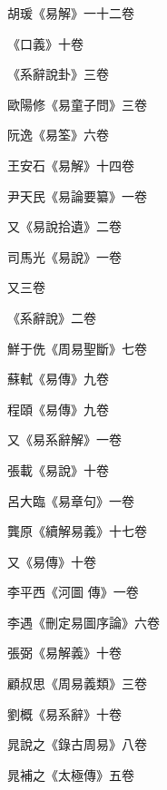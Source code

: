 \begin{pinyinscope}
 胡瑗《易解》一十二卷



 《口義》十卷



 《系辭說卦》三卷



 歐陽修《易童子問》三卷



 阮逸《易筌》六卷



 王安石《易解》十四卷



 尹天民《易論要纂》一卷



 又《易說拾遺》二卷



 司馬光《易說》一卷



 又三卷



 《系辭說》二卷



 鮮于侁《周易聖斷》七卷



 蘇軾《易傳》九卷



 程頤《易傳》九卷



 又《易系辭解》一卷



 張載《易說》十卷



 呂大臨《易章句》一卷



 龔原《續解易義》十七卷



 又《易傳》十卷



 李平西《河圖
 傳》一卷



 李遇《刪定易圖序論》六卷



 張弼《易解義》十卷



 顧叔思《周易義類》三卷



 劉概《易系辭》十卷



 晁說之《錄古周易》八卷



 晁補之《太極傳》五卷




\end{pinyinscope}
